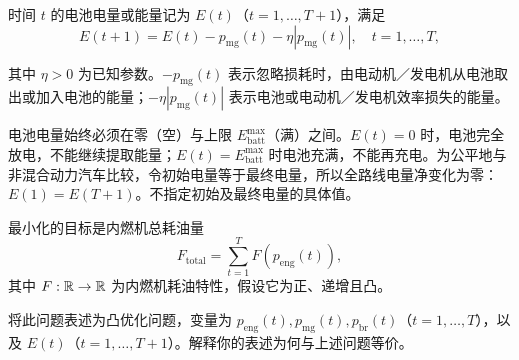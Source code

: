 时间 $t$ 的电池电量或能量记为 $E(t)$（$t=1,\ldots,T+1$），满足
\[
E(t+1)=E(t)-p_{\mathrm{mg}}(t)-\eta|p_{\mathrm{mg}}(t)|,\quad t=1,\ldots,T,
\]

其中 $\eta>0$ 为已知参数。$-p_{\mathrm{mg}}(t)$ 表示忽略损耗时，由电动机／发电机从电池取出或加入电池的能量；$-\eta|p_{\mathrm{mg}}(t)|$ 表示电池或电动机／发电机效率损失的能量。

电池电量始终必须在零（空）与上限 $E_{\mathrm{batt}}^{\max}$（满）之间。$E(t)=0$ 时，电池完全放电，不能继续提取能量；$E(t)=E_{\mathrm{batt}}^{\max}$ 时电池充满，不能再充电。为公平地与非混合动力汽车比较，令初始电量等于最终电量，所以全路线电量净变化为零：$E(1)=E(T+1)$。不指定初始及最终电量的具体值。

最小化的目标是内燃机总耗油量
\[
F_{\mathrm{total}}=\sum_{t=1}^T F(p_{\mathrm{eng}}(t)),
\]
其中 $F:\mathbb R\to\mathbb R$ 为内燃机耗油特性，假设它为正、递增且凸。

将此问题表述为凸优化问题，变量为 $p_{\mathrm{eng}}(t),p_{\mathrm{mg}}(t),p_{\mathrm{br}}(t)$（$t=1,\ldots,T$），以及 $E(t)$（$t=1,\ldots,T+1$）。解释你的表述为何与上述问题等价。

